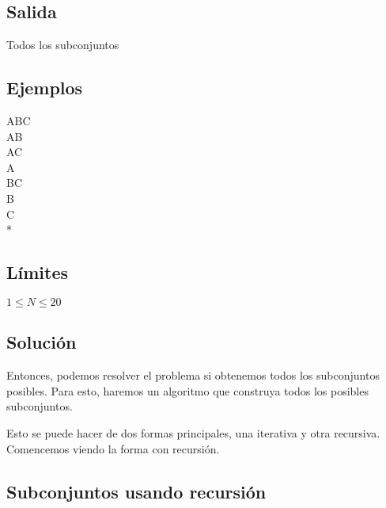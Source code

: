 \subsection*{Salida}
Todos los subconjuntos

\subsection*{Ejemplos}

\begin{casebox2}
	
	\hline
\end{casebox2}

\begin{casebox2}
	{
		ABC \\
		AB \\
		AC\\
		A\\
		BC\\
		B\\
		C\\
		* \\
	}
	\hline
\end{casebox2}

\subsection*{Límites}
\begin{plimits}
	\item \(1\leq N \leq 20 \)
\end{plimits}

\subsection*{Solución}

Entonces, podemos resolver el problema si obtenemos todos los subconjuntos posibles. Para esto, haremos un algoritmo que construya todos los posibles subconjuntos.

Esto se puede hacer de dos formas principales, una iterativa y otra recursiva. Comencemos viendo la forma con recursión.

\subsection* {Subconjuntos usando recursión}

